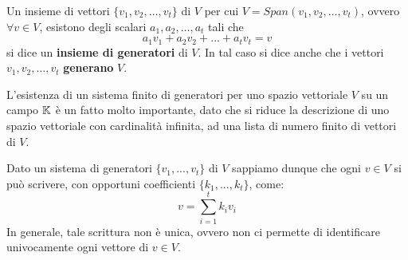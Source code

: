\begin{definition}
	Un insieme di vettori $\{v_1, v_2, \dots, v_t\}$ di $V$ per cui $V = Span(v_1, v_2, \dots, v_t)$, ovvero
	$\forall v \in V$, esistono degli scalari $a_1, a_2, \dots, a_t$ tali che
	\[ a_1 v_1 + a_2 v_2 + \dots + a_t v_t = v \]
	si dice un \textbf{insieme di generatori} di $V$. In tal caso si dice anche che i vettori
	$v_1, v_2, \dots, v_t$ \textbf{generano} $V$.
\end{definition}

L'esistenza di un sistema finito di generatori per uno spazio vettoriale $V$ su un campo $\mathbb{K}$ è un
fatto molto importante, dato che si riduce la descrizione di uno spazio vettoriale con cardinalità infinita,
ad una lista di numero finito di vettori di $V$.

Dato un sistema di generatori $\{v_1, ..., v_t\}$ di $V$ sappiamo dunque che ogni $v \in V$ si può scrivere,
con opportuni coefficienti $\{k_1, ..., k_t\}$, come:
\[ v = \sum_{i=1}^t k_i v_i \]
In generale, tale scrittura non è unica, ovvero non ci permette di identificare univocamente ogni vettore di
$v \in V$.


